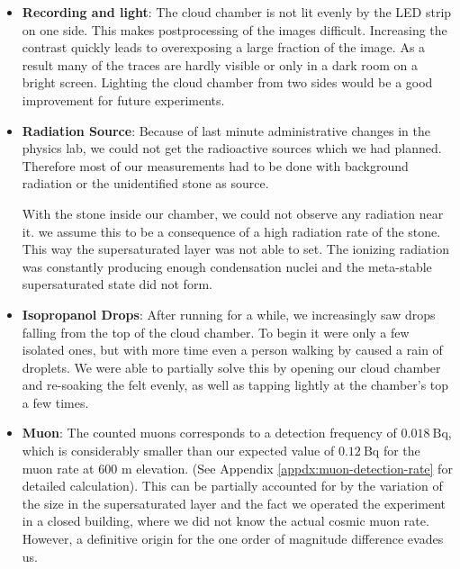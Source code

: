 \documentclass[10pt,a4paper]{article}
\begin{document}
\begin{itemize}

    \item \textbf{Recording and light}: The cloud chamber is not lit evenly by the LED strip on one side. This makes postprocessing of the images difficult. Increasing the contrast quickly leads to overexposing a large fraction of the image. As a result many of the traces are hardly visible or only in a dark room on a bright screen.
    Lighting the cloud chamber from two sides would be a good improvement for future experiments.

    \item \textbf{Radiation Source}: Because of last minute administrative changes in the physics lab, we could not get the radioactive sources which we had planned. Therefore most of our measurements had to be done with background radiation or the unidentified stone as source.

    With the stone inside our chamber, we could not observe any radiation near it. we assume this to be a consequence of a high radiation rate of the stone. This way the supersaturated layer was not able to set. The ionizing radiation was constantly producing enough condensation nuclei and the meta-stable supersaturated state did not form.

    \item \textbf{Isopropanol Drops}: After running for a while, we increasingly saw drops falling from the top of the cloud chamber. To begin it were only a few isolated ones, but with more time even a person walking by caused a rain of droplets. We were able to partially solve this by opening our cloud chamber and re-soaking the felt evenly, as well as tapping lightly at the chamber's top a few times.

    \item \textbf{Muon}: The counted muons corresponds to a detection frequency of $\qty{0.018}{\becquerel}$, which is considerably smaller than our expected  value of $\qty{0.12}{\becquerel}$ for the muon rate at 600 m elevation. (See Appendix \ref{appdx:muon-detection-rate} for detailed calculation). This can be partially accounted for by the variation of the size in the supersaturated layer and the fact we operated the experiment in a closed building, where we did not know the actual cosmic muon rate. However, a definitive origin for the one order of magnitude difference evades us.
    

\end{itemize}
\end{document}
